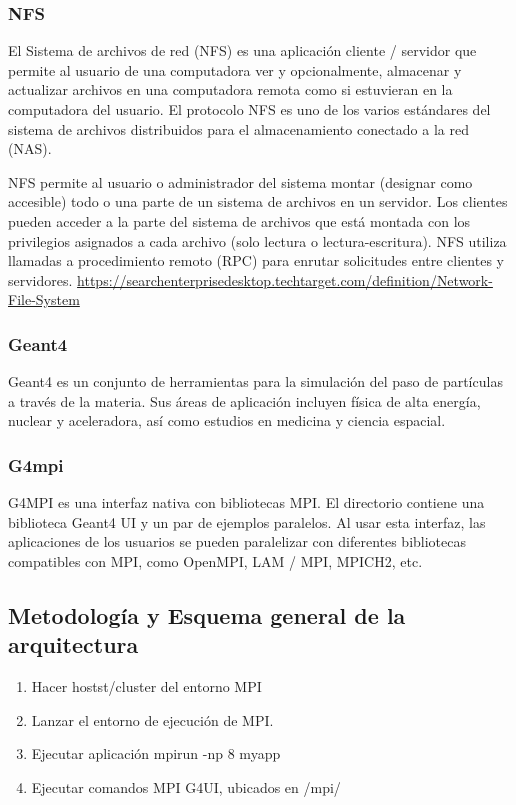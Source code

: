 \subsubsection{NFS}

El Sistema de archivos de red (NFS) es una aplicación cliente / servidor que permite al usuario de una computadora ver y opcionalmente, almacenar y actualizar archivos en una computadora remota como si estuvieran en la computadora del usuario. El protocolo NFS es uno de los varios estándares del sistema de archivos distribuidos para el almacenamiento conectado a la red (NAS).

NFS permite al usuario o administrador del sistema montar (designar como accesible) todo o una parte de un sistema de archivos en un servidor. Los clientes pueden acceder a la parte del sistema de archivos que está montada con los privilegios asignados a cada archivo (solo lectura o lectura-escritura). NFS utiliza llamadas a procedimiento remoto (RPC) para enrutar solicitudes entre clientes y servidores. \url{https://searchenterprisedesktop.techtarget.com/definition/Network-File-System}

\subsubsection{Geant4}
Geant4 es un conjunto de herramientas para la simulación del paso de partículas a través de la materia. Sus áreas de aplicación incluyen física de alta energía, nuclear y aceleradora, así como estudios en medicina y ciencia espacial.

\subsubsection{G4mpi}

G4MPI es una interfaz nativa con bibliotecas MPI. El directorio contiene una biblioteca Geant4 UI y un par de ejemplos paralelos. Al usar esta interfaz, las aplicaciones de los usuarios se pueden paralelizar con diferentes bibliotecas compatibles con MPI, como OpenMPI, LAM / MPI, MPICH2, etc.

\subsection{Metodología y Esquema general de la arquitectura}

\begin{enumerate}
    \item Hacer hostst/cluster del entorno MPI 
    \item Lanzar el entorno de ejecución de MPI.
    \item Ejecutar aplicación mpirun -np 8 myapp
    \item Ejecutar comandos MPI G4UI, ubicados en /mpi/
    
\end{enumerate}


